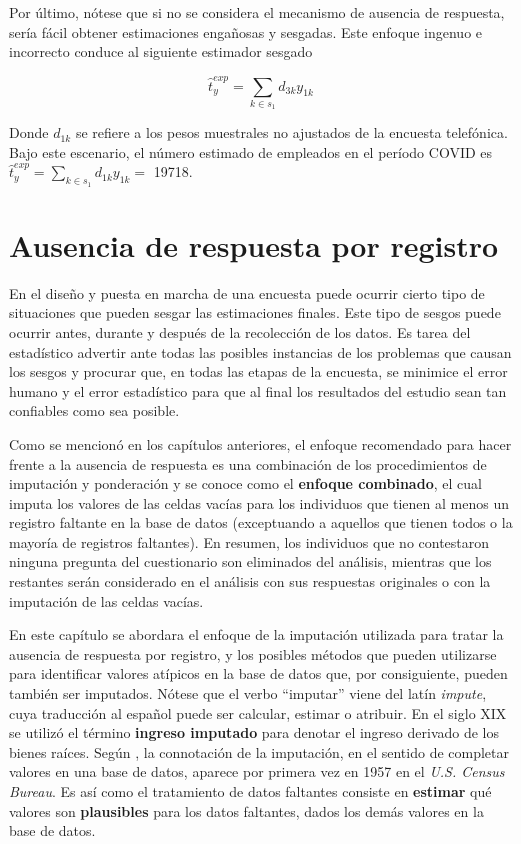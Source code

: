 \documentclass[
  12pt,
]{book}
\begin{document}
Por último, nótese que si no se considera el mecanismo de ausencia de respuesta, sería fácil obtener estimaciones engañosas y sesgadas. Este enfoque ingenuo e incorrecto conduce al siguiente estimador sesgado

\[
\hat{t}_y^{exp}=\sum_{k\in s_1}d_{3k}y_{1k}
\]

Donde \(d_{1k}\) se refiere a los pesos muestrales no ajustados de la encuesta telefónica. Bajo este escenario, el número estimado de empleados en el período COVID es \(\hat{t}_y^{exp}=\sum_{k\in s_1}d_{1k}y_{1k} =\) 19718.

\hypertarget{ausencia-de-respuesta-por-registro}{%
\chapter{Ausencia de respuesta por registro}\label{ausencia-de-respuesta-por-registro}}

En el diseño y puesta en marcha de una encuesta puede ocurrir cierto tipo de situaciones que pueden sesgar las estimaciones finales. Este tipo de sesgos puede ocurrir antes, durante y después de la recolección de los datos. Es tarea del estadístico advertir ante todas las posibles instancias de los problemas que causan los sesgos y procurar que, en todas las etapas de la encuesta, se minimice el error humano y el error estadístico para que al final los resultados del estudio sean tan confiables como sea posible.

Como se mencionó en los capítulos anteriores, el enfoque recomendado para hacer frente a la ausencia de respuesta es una combinación de los procedimientos de imputación y ponderación y se conoce como el \textbf{enfoque combinado}, el cual imputa los valores de las celdas vacías para los individuos que tienen al menos un registro faltante en la base de datos (exceptuando a aquellos que tienen todos o la mayoría de registros faltantes). En resumen, los individuos que no contestaron ninguna pregunta del cuestionario son eliminados del análisis, mientras que los restantes serán considerado en el análisis con sus respuestas originales o con la imputación de las celdas vacías.

En este capítulo se abordara el enfoque de la imputación utilizada para tratar la ausencia de respuesta por registro, y los posibles métodos que pueden utilizarse para identificar valores atípicos en la base de datos que, por consiguiente, pueden también ser imputados. Nótese que el verbo ``imputar'' viene del latín \emph{impute}, cuya traducción al español puede ser calcular, estimar o atribuir. En el siglo XIX se utilizó el término \textbf{ingreso imputado} para denotar el ingreso derivado de los bienes raíces. Según \citet{VanBuuren}, la connotación de la imputación, en el sentido de completar valores en una base de datos, aparece por primera vez en 1957 en el \emph{U.S. Census Bureau}. Es así como el tratamiento de datos faltantes consiste en \textbf{estimar} qué valores son \textbf{plausibles} para los datos faltantes, dados los demás valores en la base de datos.
\end{document}
